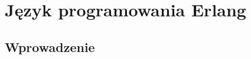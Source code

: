\chapter{Język programowania Erlang}
\label{cha:erlang}

\section{Wprowadzenie}
\label{sec:erlangWprowadzenie}


